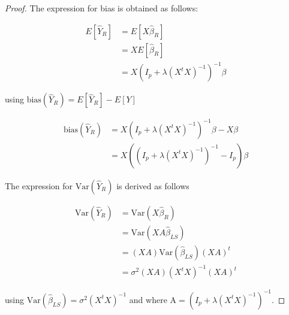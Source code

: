 \documentclass[paper=a4, fontsize=11pt]{scrartcl} %
\numberwithin{equation}{section} %
\begin{document}
\begin{proof}

The expression for bias is obtained as follows:

\begin{align}
E[\hat{Y}_R] &= E[X \hat{\beta}_R] \\
&= X E[\hat{\beta}_R] \\
&= X (I_p + \lambda (X^t X)^{-1})^{-1} \beta
\end{align}

using $\text{bias}(\hat{Y}_R) = E[\hat{Y}_R] - E[Y]$

\begin{align}
\textrm{bias}(\hat{Y}_R) &= X (I_p + \lambda (X^t X)^{-1})^{-1} \beta - X \beta \\
&= X ((I_p + \lambda (X^t X)^{-1})^{-1} - I_p) \beta
\end{align}

The expression for $\textrm{Var}(\hat{Y}_R)$ is derived as follows

\begin{align}
\textrm{Var}(\hat{Y}_R) &= \text{Var}(X \hat{\beta}_R) \\
&= \text{Var}(X A \hat{\beta}_{LS}) \\
&= (XA) \text{Var}(\hat{\beta}_{LS}) (XA)^t \\
&= \sigma^2(XA)(X^t X)^{-1}(XA)^t
\end{align}

using $ \text{Var}(\hat{\beta}_{LS}) = \sigma^2 (X^t X)^{-1}$ and where $\textrm{A} = (I_p + \lambda (X^t X)^{-1})^{-1}$.

\end{proof}
\end{document}
